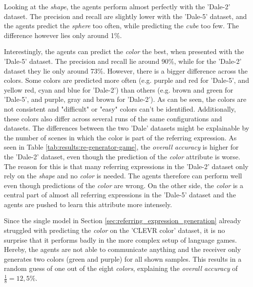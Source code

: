Looking at the \emph{shape}, the agents perform almost perfectly with the 'Dale-2' dataset.
The precision and recall are slightly lower with the 'Dale-5' dataset, and the agents predict the \emph{sphere} too often, while predicting the \emph{cube} too few.
The difference however lies only around 1\%.

Interestingly, the agents can predict the \emph{color} the best, when presented with the 'Dale-5' dataset.
The precision and recall lie around 90\%, while for the 'Dale-2' dataset they lie only around 73\%.
However, there is a bigger difference across the colors.
Some colors are predicted more often (e.g. purple and red for 'Dale-5', and yellow red, cyan and blue for 'Dale-2') than others (e.g. brown and green for 'Dale-5', and purple, gray and brown for 'Dale-2').
As can be seen, the colors are not consistent and "difficult" or "easy" colors can't be identified.
Additionally, these colors also differ across several runs of the same configurations and datasets.
The differences between the two 'Dale' datasets might be explainable by the number of scenes in which the color is part of the referring expression.
As seen in Table \ref{tab:results:re-generator-game}, the \emph{overall accuracy} is higher for the 'Dale-2' dataset, even though the prediction of the \emph{color} attribute is worse.
The reason for this is that many referring expressions in the 'Dale-2' dataset only rely on the \emph{shape} and no \emph{color} is needed.
The agents therefore can perform well even though predictions of the \emph{color} are wrong.
On the other side, the \emph{color} is a central part of almost all referring expressions in the 'Dale-5' dataset and the agents are pushed to learn this attribute more intensely.

Since the single model in Section \ref{sec:referring_expression_generation} already struggled with predicting the \emph{color} on the 'CLEVR color' dataset, it is no surprise that it performs badly in the more complex setup of language games.
Hereby, the agents are not able to communicate anything and the receiver only generates two colors (green and purple) for all shown samples.
This results in a random guess of one out of the eight \emph{colors}, explaining the \emph{overall accuracy} of $\frac{1}{8}=12,5\%$.

